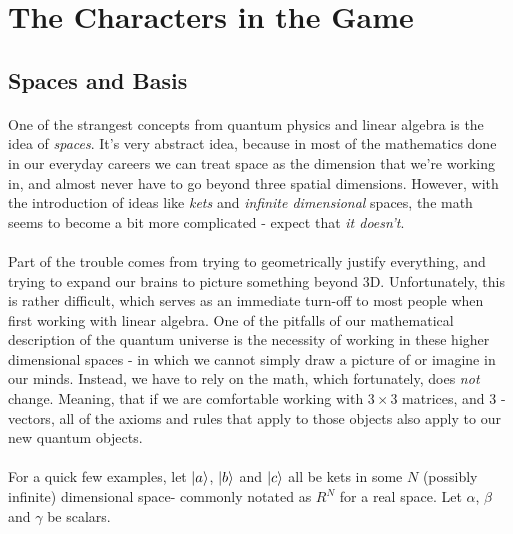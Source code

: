 \documentclass[12pt,letterpaper]{book}
\begin{document}
\section{The Characters in the Game}


\subsection*{Spaces and Basis}
\paragraph*{}One of the strangest concepts from quantum physics and linear algebra is the idea of \textit{spaces}. It's very abstract idea, because in most of the mathematics done in our everyday careers we can treat space as the dimension that we're working in, and almost never have to go beyond three spatial dimensions. However, with the introduction of ideas like \textit{kets} and \textit{infinite dimensional} spaces, the math seems to become a bit more complicated - expect that \textit{it doesn't}.
\paragraph*{}Part of the trouble comes from trying to geometrically justify everything, and trying to expand our brains to picture something beyond 3D. Unfortunately, this is rather difficult, which serves as an immediate turn-off to most people when first working with linear algebra. One of the pitfalls of our mathematical description of the quantum universe is the necessity of working in these higher dimensional spaces - in which we cannot simply draw a picture of or imagine in our minds. Instead, we have to rely on the math, which fortunately, does \textit{not} change. Meaning, that if we are comfortable working with $3 \times 3$ matrices, and 3 -vectors, all of the axioms and rules that apply to those objects also apply to our new quantum objects.
\paragraph*{}For a quick few examples, let $\ket{a}$, $\ket{b}$ and $\ket{c}$ all be kets in some $N$ (possibly infinite) dimensional space- commonly notated as $R^N$ for a real space. Let $\alpha$, $\beta$ and $\gamma$ be scalars. 
\end{document}
